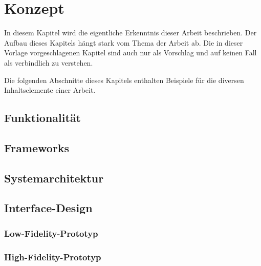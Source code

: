
\chapter{Konzept}
\label{chapter-konzept}

In diesem Kapitel wird die eigentliche Erkenntnis dieser Arbeit beschrieben. Der Aufbau dieses
Kapitels hängt stark vom Thema der Arbeit ab. Die in dieser Vorlage vorgeschlagenen Kapitel sind
auch nur als Vorschlag und auf keinen Fall als verbindlich zu verstehen.

Die folgenden Abschnitte dieses Kapitels enthalten Beispiele für die diversen Inhaltselemente einer
Arbeit.


\section{Funktionalität}

\section{Frameworks} 

\section{Systemarchitektur}

\section{Interface-Design}

\subsection*{Low-Fidelity-Prototyp}

\subsection*{High-Fidelity-Prototyp}